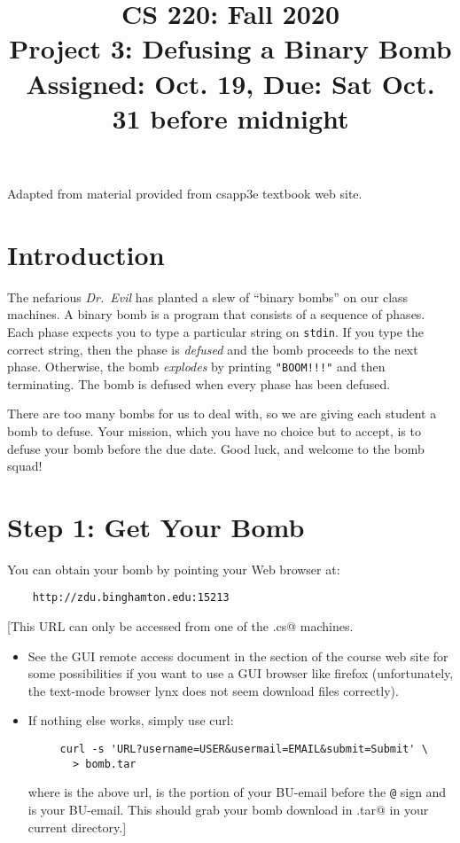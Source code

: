 \documentclass[11pt]{article}
\title{CS 220: Fall 2020\\
Project 3: Defusing a Binary Bomb\\
Assigned: Oct. 19, Due: Sat Oct. 31 before midnight\\
}
\author{}
\date{}
\begin{document}
\maketitle

Adapted from material provided from csapp3e textbook web site.

\section{Introduction}

The nefarious {\em Dr.~Evil} has planted a slew of ``binary bombs'' on
our class machines.  A binary bomb is a program that consists of a
sequence of phases. Each phase expects you to type a particular string
on \texttt{stdin}.  If you type the correct string, then the phase is
{\em defused} and the bomb proceeds to the next phase. Otherwise, the
bomb {\em explodes} by printing \verb."BOOM!!!". and then
terminating. The bomb is defused when every phase has been defused.

There are too many bombs for us to deal with, so we are giving each
student a bomb to defuse.  Your mission, which you have no choice but to
accept, is to defuse your bomb before the due date.  Good luck, and
welcome to the bomb squad!

\section*{Step 1: Get Your Bomb}

You can obtain your bomb by pointing your Web browser at:

\begin{verbatim}
    http://zdu.binghamton.edu:15213
\end{verbatim}

[This URL can only be accessed from one of the \verb@remote.cs@
machines.

\begin{itemize}
  
  \item See the GUI remote access document in the \verb@misc@ section
    of the course web site for some possibilities if you want to use a
    GUI browser like firefox (unfortunately, the text-mode browser
    lynx does not seem download files correctly).

  \item If nothing else works, simply use curl:

    \begin{verbatim}
     curl -s 'URL?username=USER&usermail=EMAIL&submit=Submit' \
       > bomb.tar
     \end{verbatim}

    where \verb@URL@ is the above url, \verb@USER@ is the portion of
    your BU-email before the \verb/@/ sign and \verb@EMAIL@ is your
    BU-email.  This should grab your bomb download in \verb@bomb.tar@
    in your current directory.]

\end{itemize}
\end{document}
